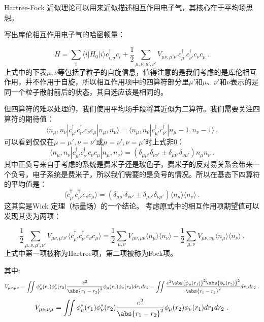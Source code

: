 
Hartree-Fock 近似理论可以用来近似描述相互作用电子气，其核心在于平均场思想。

写出库伦相互作用电子气的哈密顿量：

$$H=\sum\limits_{i}\langle i|H_0|i\rangle c_{i,\sigma}^\dagger c_{i}+\frac{1}{2}\sum\limits_{\mu ,\nu,\mu', \nu'}V_{\mu \nu,\mu' \nu'}c_{\mu'}^\dagger c_{\nu'}^\dagger c_{\nu} c_{\mu}~. $$
上式中的下表$\mu,\nu$等包括了粒子的自旋信息，值得注意的是我们考虑的是库伦相互作用，并不作用于自旋，所以相互作用项中的四算符部分里$\mu'$和$\mu$、$\nu'$和$\nu$表示的是同一个粒子散射前后的状态，其自选应该是相同的。

但四算符的难以处理的，我们使用平均场手段将其近似为二算符。我们需要关注四算符的期待值：
$$
\langle n_\mu, n_\nu |c_{\mu'}^\dagger c_{\nu'}^\dagger c_{\nu} c_{\mu} |n_\mu ,n_\nu \rangle = \langle n_\mu, n_\nu |c_{\mu'}^\dagger c_{\nu'}^\dagger |n_\mu-1 ,n_\nu-1 \rangle~.
$$
可以看到仅仅在$\mu=\mu',\nu=\nu'$或$\mu=\nu',\nu=\mu'$时上式非0：
$$\langle n_\mu, n_\nu |c_{\mu'}^\dagger c_{\nu'}^\dagger c_{\nu} c_{\mu} |n_\mu ,n_\nu \rangle = \left(\delta_{\mu\mu'}\delta_{\nu\nu'}\pm \delta_{\mu\nu'}\delta_{\nu\mu'}\right)n_\mu n_\nu~.$$
其中正负号来自于考虑的系统是费米子还是玻色子，费米子的反对易关系会带来一个负号，电子系统是费米子，所以我们需要的是负号的情况。所以在基态下四算符的平均值是：
\begin{equation}\label{eq_HFock_1}
\langle c_{\mu'}^\dagger c_{\nu'}^\dagger c_{\nu} c_{\mu} \rangle = \left(\delta_{\mu\mu'}\delta_{\nu\nu'}\pm \delta_{\mu\nu'}\delta_{\nu\mu'}\right)\langle n_\mu\rangle \langle n_\nu\rangle~.
\end{equation}
这其实是Wick 定理（标量场）的一个结论。
考虑原式中的相互作用项期望值可以发现其变为两项：

$$\frac{1}{2}\sum\limits_{\mu ,\nu,\mu', \nu'}V_{\mu \nu,\mu' \nu'}\langle c_{\mu'}^\dagger c_{\nu'}^\dagger c_{\nu} c_{\mu}\rangle=\frac{1}{2}\sum\limits_{\mu,\nu}V_{\mu\nu,\mu\nu}\langle n_\mu\rangle \langle n_\nu\rangle-\frac{1}{2}\sum\limits_{\mu,\nu}V_{\mu\nu,\nu\mu}\langle n_\mu\rangle \langle n_\nu\rangle~.$$
上式中第一项被称为Hartree项，第二项被称为Fock项。

其中:
$$V_{\mu\nu,\mu\nu}=\iint \phi_\mu^*(r_1)\phi_\nu^*(r_2)\frac{e^2}{\abs{r_1-r_2}^2}\phi_\mu(r_1)\phi_\nu(r_2)dr_1dr_2=\iint \frac{e^2\abs{\phi_\mu(r_1)}^2\abs{\phi_\nu(r_2)}^2}{\abs{r_1-r_2}^2}dr_1dr_2~.$$
$$V_{\mu\nu,\nu\mu}=\iint \phi_\mu^*(r_1)\phi_\nu^*(r_2)\frac{e^2}{\abs{r_1-r_2}^2}\phi_\mu(r_2)\phi_\nu(r_1)dr_1dr_2~.$$

